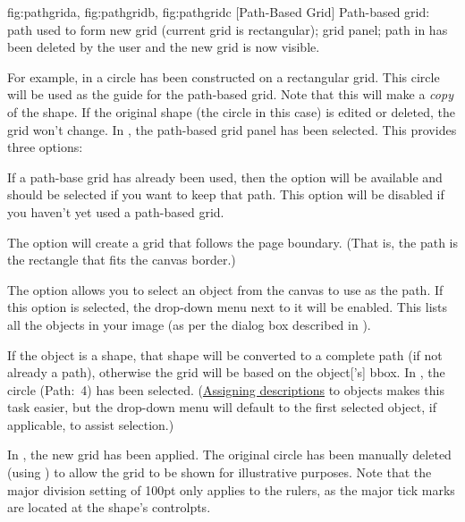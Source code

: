 {
  {fig:pathgrida}{}{},
  {fig:pathgridb}{}{},
  {fig:pathgridc}{}{}
}
 [Path-Based Grid]
 {Path-based grid:
 path used to form new grid
(current grid is rectangular);
 grid panel;
 path in
 has been deleted by the user and the new grid is now
visible.}

For example, in  a circle has been
constructed on a rectangular grid. This circle will be used as the
guide for the path-based grid. Note that this will make a
\emph{copy} of the shape. If the original shape (the circle in this
case) is edited or deleted, the grid won't change.
In , the path-based grid panel has
been selected. This provides three options:


If a path-base grid has already been used, then the
 option will be available and should be
selected if you want to keep that path.  This option will be
disabled if you haven't yet used a path-based grid.


The  option will create a grid that
follows the page boundary. (That is, the path is the rectangle that
fits the \gls{canvas} border.)


The  option allows you to select an
\gls{object} from the \gls{canvas} to use as the path.  If this
option is selected, the drop-down menu next to it will be enabled.
This lists all the objects in your image (as per the
 dialog box described in
).

If the object is a \gls{shape}, that shape
will be converted to a complete \gls{path} (if not already a
\gls{path}), otherwise the grid will be based on the
\gls{object}['s] \gls{bbox}. In ,
the circle (Path:~4) has been selected.
(\hyperref[sec:objectdescription]{Assigning descriptions} to
\glspl{object} makes this task easier, but the drop-down menu will
default to the first selected \gls{object}, if applicable, to
assist selection.)

In , the new grid has been applied.  The
original circle has been manually deleted (using ) to
allow the grid to be shown for illustrative purposes. Note that the
major division setting of 100\gls{pt} only applies to the rulers, as
the major tick marks are located at the shape's \glspl{controlpt}.



